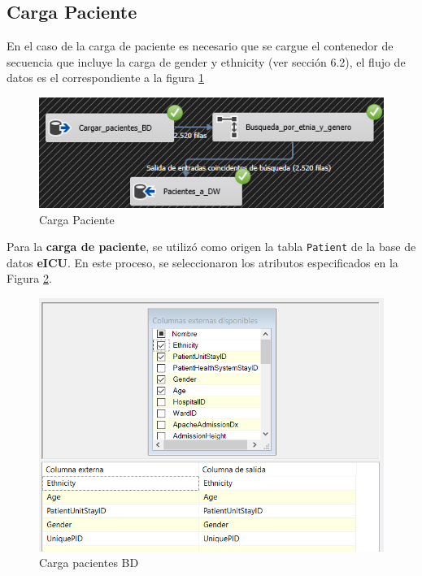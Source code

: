 \documentclass[12pt, a4paper, twoside]{article}
\begin{document}
	
	\subsection{Carga Paciente}
	
	En el caso de la carga de paciente es necesario que se cargue el contenedor de secuencia que incluye la carga de gender y ethnicity (ver sección 6.2), el flujo de datos es el correspondiente a la figura \ref{fig:17}
	
	\begin{figure}[H]
		\centering
		\includegraphics[width=1\textwidth]{image/108_carga_paciente.png}
		\caption{Carga Paciente}
		\label{fig:17}
	\end{figure}
	
	Para la \textbf{carga de paciente}, se utilizó como origen la tabla \texttt{Patient} de la base de datos \textbf{eICU}. En este proceso, se seleccionaron los atributos especificados en la Figura \ref{fig:24}.
	
	
	\begin{figure}[H]
		\centering
		\includegraphics[width=1\textwidth]{image/108_carga_paciente_origen.png}
		\caption{Carga pacientes BD}
		\label{fig:24}
	\end{figure}
	
\end{document}
